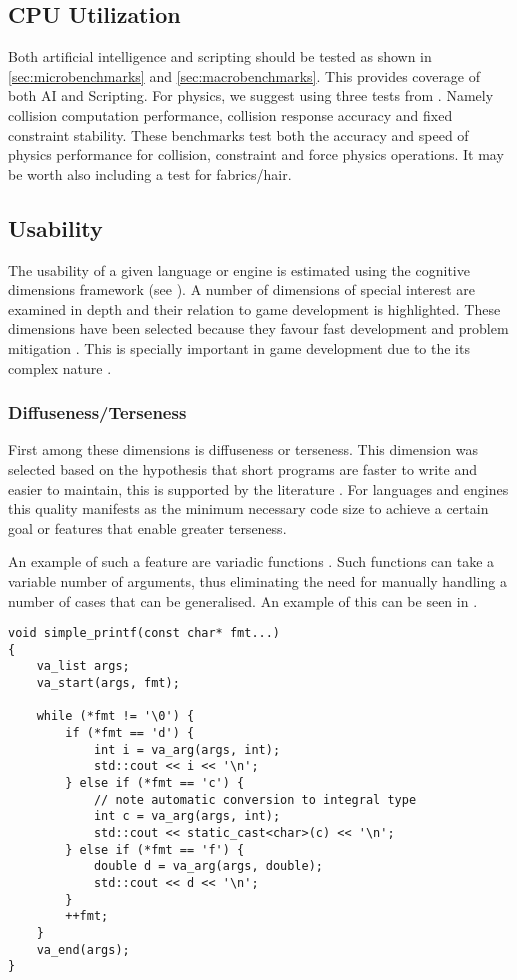 \subsection{CPU Utilization}
Both artificial intelligence and scripting should be tested as shown in \ref{sec:microbenchmarks} and \ref{sec:macrobenchmarks}. This provides coverage of both AI and Scripting.
For physics, we suggest using three tests from \cite{physics-benchmark}. Namely collision computation performance, collision response accuracy and fixed constraint stability.
These benchmarks test both the accuracy and speed of physics performance for collision, constraint and force physics operations.
It may be worth also including a test for fabrics/hair.


\subsection{Usability}
The usability of a given language or engine is estimated using the cognitive dimensions framework (see ). A number of dimensions of special interest are examined in depth and their relation to game development is highlighted. These dimensions have been selected because they favour fast development and problem mitigation \cite{ko2003development}. This is specially important in game development due to the its complex nature \cite{blow2004game}.

\subsubsection{Diffuseness/Terseness}
First among these dimensions is diffuseness or terseness. This dimension was selected based on the hypothesis that short programs are faster to write and easier to maintain, this is supported by the literature \cite{kemerer2009impact}. For languages and engines this quality manifests as the minimum necessary code size to achieve a certain goal or features that enable greater terseness.

An example of such a feature are variadic functions \cite{variadic:cppreference}. Such functions can take a variable number of arguments, thus eliminating the need for manually handling a number of cases that can be generalised. An example of this can be seen in .

\begin{lstlisting}[style=cpp, caption={Variadic Function Example}, label=lst:cpp-variadic]
void simple_printf(const char* fmt...)
{
    va_list args;
    va_start(args, fmt);
 
    while (*fmt != '\0') {
        if (*fmt == 'd') {
            int i = va_arg(args, int);
            std::cout << i << '\n';
        } else if (*fmt == 'c') {
            // note automatic conversion to integral type
            int c = va_arg(args, int);
            std::cout << static_cast<char>(c) << '\n';
        } else if (*fmt == 'f') {
            double d = va_arg(args, double);
            std::cout << d << '\n';
        }
        ++fmt;
    }
    va_end(args);
}
\end{lstlisting}

